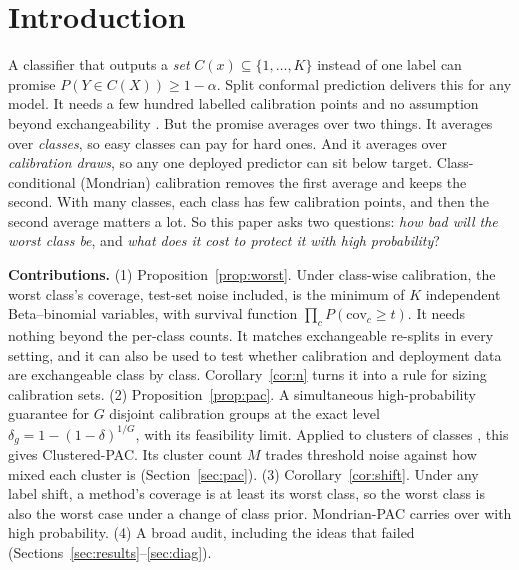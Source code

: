 \documentclass{article}
\newcommand{\cov}{\mathrm{cov}}
\begin{document}
\section{Introduction}
A classifier that outputs a \emph{set} $C(x)\subseteq\{1,\dots,K\}$ instead of one label can promise $P(Y\in C(X))\ge 1-\alpha$.
Split conformal prediction delivers this for any model. It needs a few hundred labelled calibration points and no assumption beyond
exchangeability \citep{vovk2005algorithmic,lei2018distribution,angelopoulos2021gentle}. But the promise averages over two things.
It averages over \emph{classes}, so easy classes can pay for hard ones. And it averages over \emph{calibration draws}, so any one
deployed predictor can sit below target. Class-conditional (Mondrian) calibration \citep{vovk2012conditional} removes the first
average and keeps the second. With many classes, each class has few calibration points, and then the second average matters a lot.
So this paper asks two questions: \emph{how bad will the worst class be}, and \emph{what does it cost to protect it with high
probability}?

\textbf{Contributions.}
(1) Proposition~\ref{prop:worst}. Under class-wise calibration, the worst class's coverage, test-set noise included, is the minimum of
$K$ independent Beta--binomial variables, with survival function $\prod_c P(\cov_c\ge t)$. It needs nothing beyond the per-class counts.
It matches exchangeable re-splits in every setting, and it can also be used to test whether calibration and deployment data are
exchangeable class by class. Corollary~\ref{cor:n} turns it into a rule for sizing calibration sets.
(2) Proposition~\ref{prop:pac}. A simultaneous high-probability guarantee for $G$ disjoint calibration groups at the exact level
$\delta_g=1-(1-\delta)^{1/G}$, with its feasibility limit. Applied to clusters of classes \citep{ding2023class}, this gives
Clustered-PAC. Its cluster count $M$ trades threshold noise against how mixed each cluster is (Section~\ref{sec:pac}).
(3) Corollary~\ref{cor:shift}. Under any label shift, a method's coverage is at least its worst class, so the worst class is also the
worst case under a change of class prior. Mondrian-PAC carries over with high probability.
(4) A broad audit, including the ideas that failed (Sections~\ref{sec:results}--\ref{sec:diag}).

\end{document}
